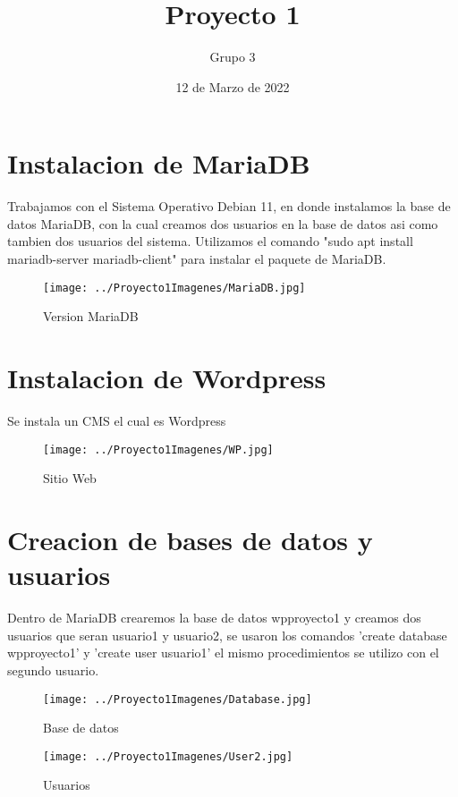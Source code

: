 \documentclass[11pt,a4paper]{article}
\author{Grupo 3}
\title{Proyecto 1}
\date{12 de Marzo de 2022}
\begin{document}
\maketitle
\section{Instalacion de MariaDB}
Trabajamos con el Sistema Operativo Debian 11, en donde instalamos la base de datos MariaDB, con la cual creamos dos usuarios en la base de datos asi como tambien dos usuarios del sistema. Utilizamos el comando "sudo apt install mariadb-server mariadb-client" para instalar el paquete de MariaDB.
\newline
\begin{figure}[hbtp]
\caption{Version MariaDB}
\centering
\texttt{[image: ../Proyecto1Imagenes/MariaDB.jpg]}
\end{figure}
\section{Instalacion de Wordpress}
Se instala un CMS el cual es Wordpress
\begin{figure}[hbtp]
\centering
\texttt{[image: ../Proyecto1Imagenes/WP.jpg]}
\caption{Sitio Web}
\end{figure}
\newline
\newline
\newline
\section{Creacion de bases de datos y usuarios}
Dentro de MariaDB crearemos la base de datos wpproyecto1 y creamos dos usuarios que seran usuario1 y usuario2, se usaron los comandos 'create database wpproyecto1' y 'create user usuario1' el mismo procedimientos se utilizo con el segundo usuario.
\begin{figure}[hbtp]
\centering
\texttt{[image: ../Proyecto1Imagenes/Database.jpg]}
\caption{Base de datos}
\end{figure}
\begin{figure}[hbtp]
\centering
\texttt{[image: ../Proyecto1Imagenes/User2.jpg]}
\caption{Usuarios}
\end{figure}
\newline
\newline
\newline
\newline
\newline
\newline
\newline
\newline
\newline
\newline
\newline
\newline
\newline
\newline
\end{document}
